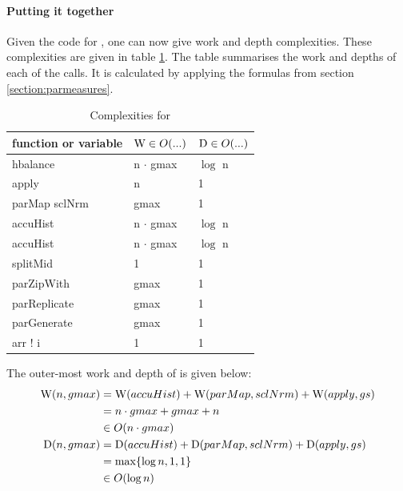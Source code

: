   \paragraph{Putting it together}
    Given the code for \man, one can now give work and depth
    complexities. These complexities are given in table \ref{table:man}.
    The table summarises the work and depths of each of the calls.
    It is calculated by applying the formulas from section
    \ref{section:parmeasures}.
    
  \begin{table}[h]
    \centering
    \caption{Complexities for \man}
    \label{table:man}
    \begin{tabular}{lll}
        \toprule
        function or variable & $\textrm{W} \in O(...)$           & $\textrm{D} \in O(...)$ \\
        \midrule
        hbalance        & n $\cdot$ gmax    & $\log$ n \\
        apply           & n           & 1 \\
        parMap sclNrm   & gmax        & 1 \\
        accuHist        & n  $\cdot$ gmax    & $\log$ n \\
        \midrule
        accuHist        & n  $\cdot$ gmax    & $\log$ n \\
        splitMid        & 1           & 1 \\
        parZipWith      & gmax        & 1 \\
        parReplicate    & gmax        & 1 \\
        parGenerate     & gmax        & 1 \\
        arr ! i         & 1           & 1 \\
    \end{tabular}
  \end{table}
  
  
  The outer-most work and depth of \man is given below:
  \begin{equation*}
  \begin{split}
  \textrm{W}(n,gmax)
        & = \textrm{W}(accuHist) + \textrm{W}(parMap,sclNrm) + \textrm{W}(apply,gs) \\
        & = n \cdot gmax + gmax + n \\
        & \in O(n \cdot gmax) \\
  \textrm{D}(n,gmax)
      & = \textrm{D}(accuHist) + \textrm{D}(parMap,sclNrm) +  \textrm{D}(apply,gs) \\
      & = \max \{ \log n, 1, 1\} \\
      & \in O(\log n) \\
  \end{split}
  \end{equation*}
  
